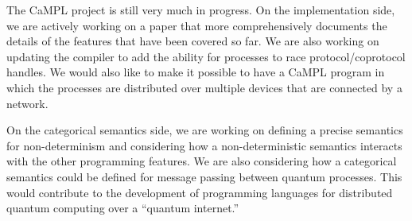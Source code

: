 \documentclass[11pt]{article}
\begin{document}
The CaMPL project is still very much in progress.
On the implementation side, we are actively working on a paper that more comprehensively documents the details of the features that have been covered so far.
We are also working on updating the compiler to add the ability for processes to race protocol/coprotocol handles.
We would also like to make it possible to have a CaMPL program in which the processes are distributed over multiple devices that are connected by a network.

On the categorical semantics side, we are working on defining a precise semantics for non-determinism and considering how a non-deterministic semantics interacts with the other programming features.
We are also considering how a categorical semantics could be defined for message passing between quantum processes.
This would contribute to the development of programming languages for distributed quantum computing over a ``quantum internet.''


\printbibliography
\end{document}
